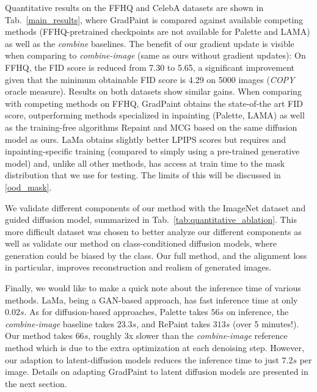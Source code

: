 




Quantitative results on the FFHQ and CelebA datasets are shown in Tab.~\ref{main_results}, where GradPaint is compared against available competing methods (FFHQ-pretrained checkpoints are not available for Palette and LAMA) as well as the \textit{combine} baselines. The benefit of our gradient update is visible when comparing to \textit{combine-image} (same as ours without gradient updates): On FFHQ, the FID score is reduced from 7.30 to 5.65, a significant improvement given that the minimum obtainable FID score is 4.29 on 5000 images (\textit{COPY} oracle measure). Results on both datasets show similar gains. When comparing with competing methods on FFHQ, GradPaint obtains the state-of-the art FID score, outperforming methods specialized in inpainting (Palette, LAMA) as well as the training-free algorithms Repaint and MCG based on the same diffusion model as ours. LaMa obtains slightly better LPIPS scores but requires and inpainting-specific training (compared to simply using a pre-trained generative model) and, unlike all other methods, has access at train time to the mask distribution that we use for testing. The limits of this will be discussed in \ref{ood_mask}.

We validate different components of our method with the ImageNet\cite{imagenet} dataset and  guided diffusion model, summarized in Tab.~\ref{tab:quantitative_ablation}. This more difficult dataset was chosen to better analyze our different components as well as validate our method on class-conditioned diffusion models, where generation could be biased by the class. Our full method, and the alignment loss in particular, improves reconstruction and realism of generated images.

Finally, we would like to make a quick note about the inference time of various methods. LaMa\cite{lama}, being a GAN-based approach, has fast inference time at only $0.02s$. As for diffusion-based approaches, Palette\cite{saharia2022palette} takes $56s$ on inference, the \textit{combine-image} baseline takes $23.3s$, and RePaint\cite{repaint} takes $313s$ (over 5 minutes!). Our method takes $66s$, roughly 3x slower than the \textit{combine-image} reference method which is due to the extra optimization at each denoising step. However, our adaption to latent-diffusion models reduces the inference time to just $7.2s$ per image. Details on adapting GradPaint to latent diffusion models are presented in the next section.

